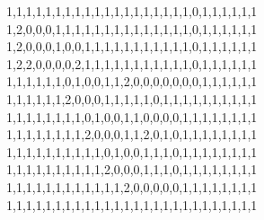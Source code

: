 1,1,1,1,1,1,1,1,1,1,1,1,1,1,1,1,1,1,1,0,1,1,1,1,1,1
1,2,0,0,0,1,1,1,1,1,1,1,1,1,1,1,1,1,1,0,1,1,1,1,1,1
1,2,0,0,0,1,0,0,1,1,1,1,1,1,1,1,1,1,1,0,1,1,1,1,1,1
1,2,2,0,0,0,0,2,1,1,1,1,1,1,1,1,1,1,1,0,1,1,1,1,1,1
1,1,1,1,1,1,0,1,0,0,1,1,2,0,0,0,0,0,0,0,1,1,1,1,1,1
1,1,1,1,1,1,2,0,0,0,1,1,1,1,1,0,1,1,1,1,1,1,1,1,1,1
1,1,1,1,1,1,1,1,0,1,0,0,1,1,0,0,0,0,1,1,1,1,1,1,1,1
1,1,1,1,1,1,1,1,2,0,0,0,1,1,2,0,1,0,1,1,1,1,1,1,1,1
1,1,1,1,1,1,1,1,1,1,0,1,0,0,1,1,1,0,1,1,1,1,1,1,1,1
1,1,1,1,1,1,1,1,1,1,2,0,0,0,1,1,1,0,1,1,1,1,1,1,1,1
1,1,1,1,1,1,1,1,1,1,1,1,2,0,0,0,0,0,1,1,1,1,1,1,1,1
1,1,1,1,1,1,1,1,1,1,1,1,1,1,1,1,1,1,1,1,1,1,1,1,1,1